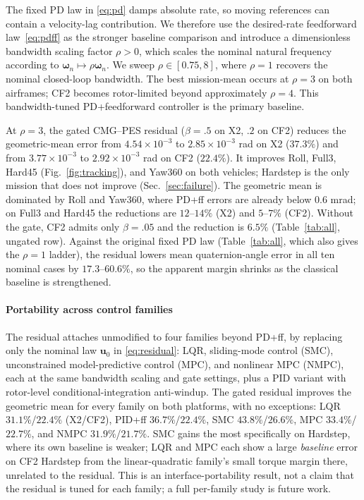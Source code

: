 \documentclass[letterpaper, 10 pt, conference]{ieeeconf}
\begin{document}
The fixed PD law in \eqref{eq:pd} damps absolute rate, so moving references can contain a velocity-lag contribution. We therefore use the desired-rate feedforward law~\eqref{eq:pdff} as the stronger baseline comparison and introduce a dimensionless bandwidth scaling factor $\rho>0$, which scales the nominal natural frequency according to $\bm\omega_n\mapsto\rho\bm\omega_n$. We sweep $\rho\in[0.75,8]$, where $\rho=1$ recovers the nominal closed-loop bandwidth. The best mission-mean occurs at $\rho=3$ on both airframes; CF2 becomes rotor-limited beyond approximately $\rho=4$. This bandwidth-tuned PD+feedforward controller is the primary baseline.

At $\rho=3$, the gated CMG--PES residual ($\beta=.5$ on X2, $.2$ on CF2) reduces the geometric-mean error from $4.54\times10^{-3}$ to $2.85\times10^{-3}$ rad on X2 ($37.3\%$) and from $3.77\times10^{-3}$ to $2.92\times10^{-3}$ rad on CF2 ($22.4\%$). It improves Roll, Full3, Hard45 (Fig.~\ref{fig:tracking}), and Yaw360 on both vehicles; Hardstep is the only mission that does not improve (Sec.~\ref{sec:failure}). The geometric mean is dominated by Roll and Yaw360, where PD+ff errors are already below $0.6$ mrad; on Full3 and Hard45 the reductions are $12$--$14\%$ (X2) and $5$--$7\%$ (CF2). Without the gate, CF2 admits only $\beta=.05$ and the reduction is $6.5\%$ (Table~\ref{tab:all}, ungated row). Against the original fixed PD law (Table~\ref{tab:all}, which also gives the $\rho=1$ ladder), the residual lowers mean quaternion-angle error in all ten nominal cases by $17.3$--$60.6\%$, so the apparent margin shrinks as the classical baseline is strengthened.

\paragraph{Portability across control families} The residual attaches unmodified to four families beyond PD+ff, by replacing only the nominal law $\bm u_0$ in \eqref{eq:residual}: LQR, sliding-mode control (SMC), unconstrained model-predictive control (MPC), and nonlinear MPC (NMPC), each at the same bandwidth scaling and gate settings, plus a PID variant with rotor-level conditional-integration anti-windup. The gated residual improves the geometric mean for every family on both platforms, with no exceptions: LQR $31.1\%$/$22.4\%$ (X2/CF2), PID+ff $36.7\%$/$22.4\%$, SMC $43.8\%$/$26.6\%$, MPC $33.4\%$/$22.7\%$, and NMPC $31.9\%$/$21.7\%$. SMC gains the most specifically on Hardstep, where its own baseline is weaker; LQR and MPC each show a large \emph{baseline} error on CF2 Hardstep from the linear-quadratic family's small torque margin there, unrelated to the residual. This is an interface-portability result, not a claim that the residual is tuned for each family; a full per-family study is future work.
\end{document}
